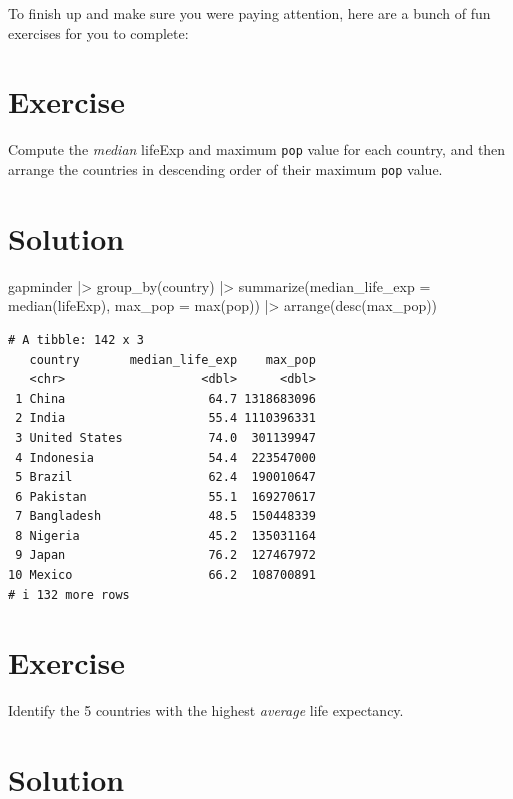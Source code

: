 \documentclass[
  letterpaper,
  DIV=11,
  numbers=noendperiod]{scrreprt}
\newenvironment{Shaded}{\begin{snugshade}}{\end{snugshade}}
\newcommand{\AttributeTok}[1]{\textcolor[rgb]{0.40,0.45,0.13}{#1}}
\newcommand{\FunctionTok}[1]{\textcolor[rgb]{0.28,0.35,0.67}{#1}}
\newcommand{\NormalTok}[1]{\textcolor[rgb]{0.00,0.23,0.31}{#1}}
\newcommand{\SpecialCharTok}[1]{\textcolor[rgb]{0.37,0.37,0.37}{#1}}
\begin{document}
To finish up and make sure you were paying attention, here are a bunch
of fun exercises for you to complete:

\section{Exercise}

Compute the \emph{median} lifeExp and maximum \texttt{pop} value for
each country, and then arrange the countries in descending order of
their maximum \texttt{pop} value.

\section{Solution}

\begin{Shaded}
\begin{Highlighting}[]
\NormalTok{gapminder }\SpecialCharTok{|\textgreater{}}
  \FunctionTok{group\_by}\NormalTok{(country) }\SpecialCharTok{|\textgreater{}}
  \FunctionTok{summarize}\NormalTok{(}\AttributeTok{median\_life\_exp =} \FunctionTok{median}\NormalTok{(lifeExp),}
            \AttributeTok{max\_pop =} \FunctionTok{max}\NormalTok{(pop)) }\SpecialCharTok{|\textgreater{}}
  \FunctionTok{arrange}\NormalTok{(}\FunctionTok{desc}\NormalTok{(max\_pop))}
\end{Highlighting}
\end{Shaded}

\begin{verbatim}
# A tibble: 142 x 3
   country       median_life_exp    max_pop
   <chr>                   <dbl>      <dbl>
 1 China                    64.7 1318683096
 2 India                    55.4 1110396331
 3 United States            74.0  301139947
 4 Indonesia                54.4  223547000
 5 Brazil                   62.4  190010647
 6 Pakistan                 55.1  169270617
 7 Bangladesh               48.5  150448339
 8 Nigeria                  45.2  135031164
 9 Japan                    76.2  127467972
10 Mexico                   66.2  108700891
# i 132 more rows
\end{verbatim}

\section{Exercise}

Identify the 5 countries with the highest \emph{average} life
expectancy.

\section{Solution}
\end{document}
